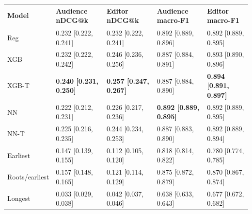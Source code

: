 \begin{tabular}{lllll}
\toprule
Model & Audience nDCG@k & Editor nDCG@k & Audience macro-F1 & Editor macro-F1 \\
\midrule
Reg & 0.232 [0.222, 0.241] & 0.232 [0.222, 0.241] & 0.892 [0.889, 0.896] & 0.892 [0.889, 0.895] \\
XGB & 0.232 [0.222, 0.242] & 0.246 [0.236, 0.256] & 0.887 [0.884, 0.891] & 0.893 [0.890, 0.896] \\
XGB-T & \textbf{0.240 [0.231, 0.250]} & \textbf{0.257 [0.247, 0.267]} & 0.887 [0.884, 0.890] & \textbf{0.894 [0.891, 0.897]} \\
NN & 0.222 [0.212, 0.231] & 0.226 [0.217, 0.236] & \textbf{0.892 [0.889, 0.895]} & 0.892 [0.889, 0.895] \\
NN-T & 0.225 [0.216, 0.235] & 0.244 [0.234, 0.253] & 0.887 [0.883, 0.890] & 0.892 [0.889, 0.894] \\
\midrule
Earliest & 0.147 [0.139, 0.155] & 0.112 [0.105, 0.120] & 0.818 [0.814, 0.822] & 0.780 [0.774, 0.785] \\
Roots/earliest & 0.157 [0.148, 0.165] & 0.121 [0.114, 0.129] & 0.875 [0.872, 0.879] & 0.870 [0.867, 0.874] \\
Longest & 0.033 [0.029, 0.038] & 0.042 [0.037, 0.046] & 0.638 [0.633, 0.643] & 0.677 [0.672, 0.682] \\
\bottomrule
\end{tabular}
